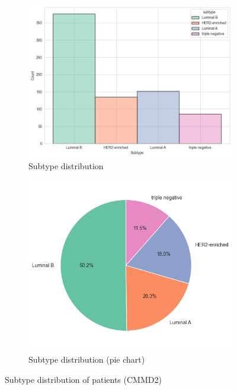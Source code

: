 \documentclass[a4paper,10pt]{book}
\begin{document}
\begin{figure}[h!]
	\centering
	\begin{subfigure}[c]{0.45\textwidth}
		\centering
		\includegraphics[width=\textwidth]{reports//assets/subtype_hist.png}
		\caption{Subtype distribution}
		\label{fig:subtype_hist}
	\end{subfigure}
	\begin{subfigure}[c]{0.45\textwidth}
		\centering
		\includegraphics[width=\textwidth]{reports/assets/subtype_pie.png}
		\caption{Subtype distribution (pie chart)}
		\label{fig:subtype_pie}
	\end{subfigure}
	\caption{Subtype distribution of patients (CMMD2)}
	\label{fig:subtype_charts}
\end{figure}
\end{document}
